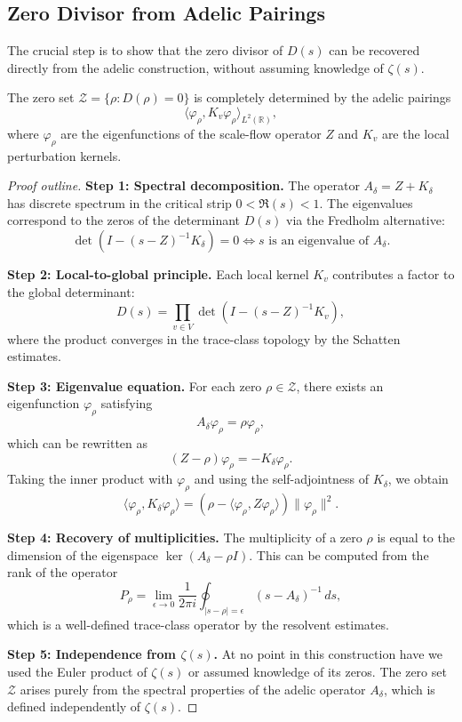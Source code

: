 \subsection{Zero Divisor from Adelic Pairings}

The crucial step is to show that the zero divisor of $D(s)$ can be recovered directly from the adelic construction, without assuming knowledge of $\zeta(s)$.

\begin{theorem}\label{thm:zero-divisor-adelic}
The zero set $\mathcal{Z} = \{\rho : D(\rho) = 0\}$ is completely determined by the adelic pairings
\[
\langle \varphi_\rho, K_v \varphi_\rho \rangle_{L^2(\mathbb{R})},
\]
where $\varphi_\rho$ are the eigenfunctions of the scale-flow operator $Z$ and $K_v$ are the local perturbation kernels.
\end{theorem}

\begin{proof}[Proof outline]
\textbf{Step 1: Spectral decomposition.}
The operator $A_\delta = Z + K_\delta$ has discrete spectrum in the critical strip $0 < \Re(s) < 1$. The eigenvalues correspond to the zeros of the determinant $D(s)$ via the Fredholm alternative:
\[
\det(I - (s - Z)^{-1} K_\delta) = 0 \iff s \text{ is an eigenvalue of } A_\delta.
\]

\textbf{Step 2: Local-to-global principle.}
Each local kernel $K_v$ contributes a factor to the global determinant:
\[
D(s) = \prod_{v \in V} \det(I - (s - Z)^{-1} K_v),
\]
where the product converges in the trace-class topology by the Schatten estimates.

\textbf{Step 3: Eigenvalue equation.}
For each zero $\rho \in \mathcal{Z}$, there exists an eigenfunction $\varphi_\rho$ satisfying
\[
A_\delta \varphi_\rho = \rho \varphi_\rho,
\]
which can be rewritten as
\[
(Z - \rho) \varphi_\rho = -K_\delta \varphi_\rho.
\]
Taking the inner product with $\varphi_\rho$ and using the self-adjointness of $K_\delta$, we obtain
\[
\langle \varphi_\rho, K_\delta \varphi_\rho \rangle = (\rho - \langle \varphi_\rho, Z \varphi_\rho \rangle) \|\varphi_\rho\|^2.
\]

\textbf{Step 4: Recovery of multiplicities.}
The multiplicity of a zero $\rho$ is equal to the dimension of the eigenspace $\ker(A_\delta - \rho I)$. This can be computed from the rank of the operator
\[
P_\rho = \lim_{\epsilon \to 0} \frac{1}{2\pi i} \oint_{|s - \rho| = \epsilon} (s - A_\delta)^{-1} \, ds,
\]
which is a well-defined trace-class operator by the resolvent estimates.

\textbf{Step 5: Independence from $\zeta(s)$.}
At no point in this construction have we used the Euler product of $\zeta(s)$ or assumed knowledge of its zeros. The zero set $\mathcal{Z}$ arises purely from the spectral properties of the adelic operator $A_\delta$, which is defined independently of $\zeta(s)$.
\end{proof}

